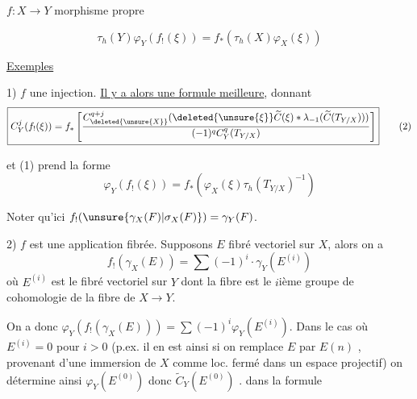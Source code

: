 
\(f:X\longrightarrow Y\) morphisme propre

\[
\boxed{\tau_h(Y)\varphi_Y(f_!(\xi))=f_*(\tau_h(X)\varphi_X(\xi))}\tag{1}
\]

\uline{Exemples}

1) \(f\) une injection. \uline{Il y a alors une formule meilleure}, donnant
\[
\boxed{C^j_Y(f_!(\xi))=f_*\left[\frac{C^{q+j}_{\deleted{\unsure{X}}}(\deleted{\unsure{\xi}}\widetilde C(\xi)*\lambda_{-1}(\widetilde C(T_{Y/X})))}{(-1)^q C^q_Y(T_{Y/X})}\right]}\tag{2}
\]
 

et (1) prend la forme
\[
\boxed{\varphi_Y(f_!(\xi))=f_*(\varphi_X(\xi)\tau_h(T_{Y/X})^{-1})}\tag{1bis}
\]

Noter qu'ici \(f_!(\unsure{\gamma_X(F)|\sigma_X(F)})=\gamma_Y(F)\).

2) \(f\) est une application fibrée. Supposons \(E\) fibré vectoriel sur \(X\), alors on a
\[
f_!(\gamma_X(E))=\sum(-1)^i\cdot\gamma_Y(E^{(i)})
\]
où \(E^{(i)}\) est le fibré vectoriel sur \(Y\) dont la fibre est le \(i\)ième groupe de cohomologie de la fibre de \(X\to Y\).

On a donc \(\varphi_Y(f_!(\gamma_X(E)))=\sum(-1)^i\varphi_Y(E^{(i)})\). Dans le cas où \(E^{(i)}=0\) pour \(i>0\) (p.ex. il en est ainsi si on remplace \(E\) par \(E(n)\) , provenant d'une immersion de \(X\) comme loc. fermé dans un espace projectif) on détermine ainsi \(\varphi_Y(E^{(0)})\) donc \(\widetilde C_Y(E^{(0)})\) \deleted{\(\unsure{\xi}\)}.   dans la formule

